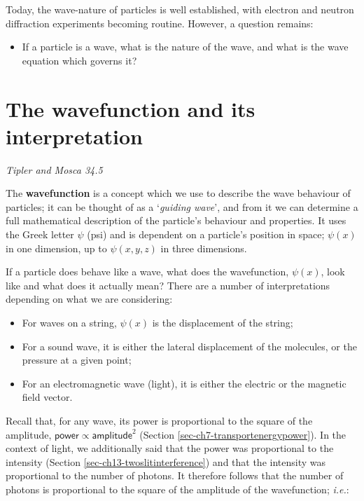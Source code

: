 \documentclass[
]{book}
\providecommand{\tightlist}{%
  \setlength{\itemsep}{0pt}\setlength{\parskip}{0pt}}
\begin{document}
Today, the wave-nature of particles is well established, with electron and neutron diffraction experiments becoming routine. However, a question remains:

\begin{itemize}
\tightlist
\item
  If a particle is a wave, what is the nature of the wave, and what is the wave equation which governs it?
\end{itemize}

\hypertarget{sec-ch17-wavefunction1}{%
\section{The wavefunction and its interpretation}\label{sec-ch17-wavefunction1}}

\emph{Tipler and Mosca 34.5}

The \textbf{wavefunction} is a concept which we use to describe the wave behaviour of particles; it can be thought of as a `\emph{guiding wave}', and from it we can determine a full mathematical description of the particle's behaviour and properties. It uses the Greek letter \(\psi\) (psi) and is dependent on a particle's position in space; \(\psi(x)\) in one dimension, up to \(\psi(x,y,z)\) in three dimensions.

If a particle does behave like a wave, what does the wavefunction, \(\psi(x)\), look like and what does it actually mean? There are a number of interpretations depending on what we are considering:

\begin{itemize}
\tightlist
\item
  For waves on a string, \(\psi(x)\) is the displacement of the string;
\item
  For a sound wave, it is either the lateral displacement of the molecules, or the pressure at a given point;
\item
  For an electromagnetic wave (light), it is either the electric or the magnetic field vector.
\end{itemize}

Recall that, for any wave, its power is proportional to the square of the amplitude, \(\textsf{power} \propto \textsf{amplitude}^2\) (Section \ref{sec-ch7-transportenergypower}). In the context of light, we additionally said that the power was proportional to the intensity (Section \ref{sec-ch13-twoslitinterference}) and that the intensity was proportional to the number of photons. It therefore follows that the number of photons is proportional to the square of the amplitude of the wavefunction; \emph{i.e.}:
\end{document}
